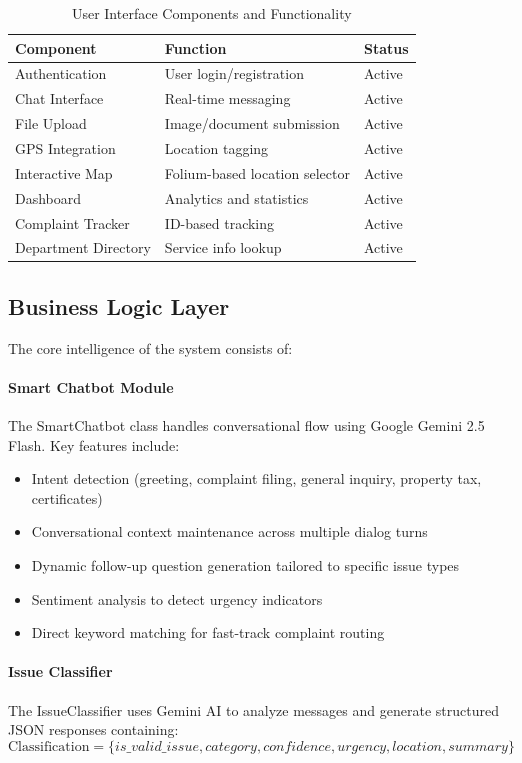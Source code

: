 \documentclass[11pt,a4paper]{article}
\begin{document}
\begin{table}[H]
\centering
\caption{User Interface Components and Functionality}
\label{tab:ui_components}
\begin{tabular}{|l|l|l|}
\hline
\textbf{Component} & \textbf{Function} & \textbf{Status} \\
\hline
Authentication & User login/registration & Active \\
Chat Interface & Real-time messaging & Active \\
File Upload & Image/document submission & Active \\
GPS Integration & Location tagging & Active \\
Interactive Map & Folium-based location selector & Active \\
Dashboard & Analytics and statistics & Active \\
Complaint Tracker & ID-based tracking & Active \\
Department Directory & Service info lookup & Active \\
\hline
\end{tabular}
\end{table}

\subsection{Business Logic Layer}

The core intelligence of the system consists of:

\paragraph{Smart Chatbot Module} The SmartChatbot class handles conversational flow using Google Gemini 2.5 Flash. Key features include:
\begin{itemize}
    \item Intent detection (greeting, complaint filing, general inquiry, property tax, certificates)
    \item Conversational context maintenance across multiple dialog turns
    \item Dynamic follow-up question generation tailored to specific issue types
    \item Sentiment analysis to detect urgency indicators
    \item Direct keyword matching for fast-track complaint routing
\end{itemize}

\paragraph{Issue Classifier} The IssueClassifier uses Gemini AI to analyze messages and generate structured JSON responses containing:
\[\text{Classification} = \{is\_valid\_issue, category, confidence, urgency, location, summary\}\]
\end{document}
